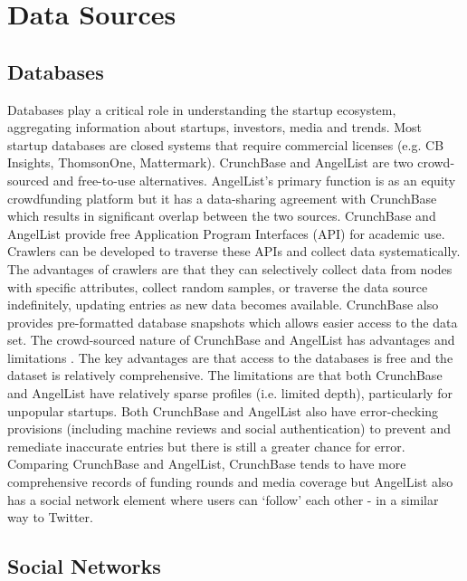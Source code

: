 \chapter{Data Sources}
\label{appendix:data_sources}

\section{Databases} %

Databases play a critical role in understanding the startup ecosystem, aggregating information about startups, investors, media and trends. Most startup databases are closed systems that require commercial licenses (e.g. CB Insights, ThomsonOne, Mattermark). CrunchBase and AngelList are two crowd-sourced and free-to-use alternatives. AngelList’s primary function is as an equity crowdfunding platform but it has a data-sharing agreement with CrunchBase which results in significant overlap between the two sources. CrunchBase and AngelList provide free Application Program Interfaces (API) for academic use. Crawlers can be developed to traverse these APIs and collect data systematically. The advantages of crawlers are that they can selectively collect data from nodes with specific attributes, collect random samples, or traverse the data source indefinitely, updating entries as new data becomes available. CrunchBase also provides pre-formatted database snapshots which allows easier access to the data set. The crowd-sourced nature of CrunchBase and AngelList has advantages and limitations . The key advantages are that access to the databases is free and the dataset is relatively comprehensive. The limitations are that both CrunchBase and AngelList have relatively sparse profiles (i.e. limited depth), particularly for unpopular startups. Both CrunchBase and AngelList also have error-checking provisions (including machine reviews and social authentication) to prevent and remediate inaccurate entries but there is still a greater chance for error. Comparing CrunchBase and AngelList, CrunchBase tends to have more comprehensive records of funding rounds \cite{cheng2016} and media coverage but AngelList also has a social network element where users can `follow’ each other - in a similar way to Twitter.

\section{Social Networks}

